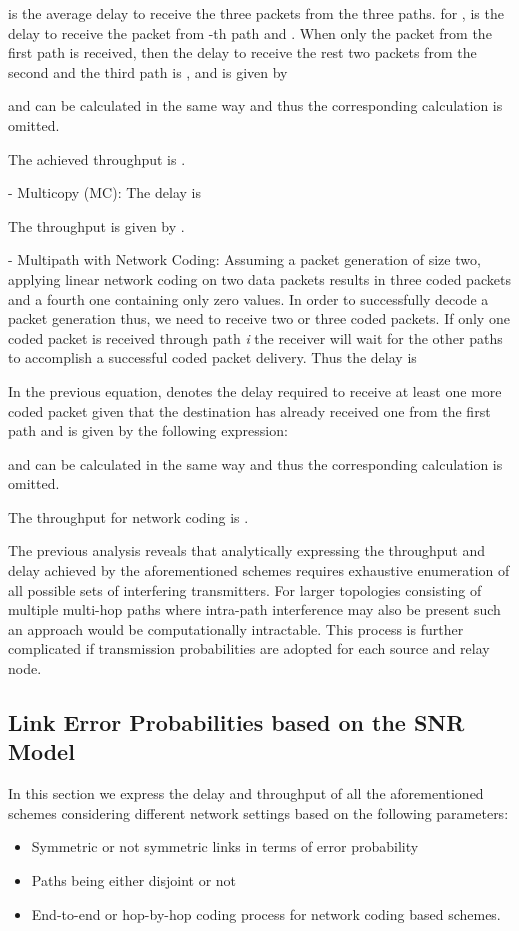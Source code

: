 \documentclass[journal, onecolumn, 12pt]{IEEEtran}
\begin{document}
 is the average delay to receive the three packets from the three paths.  for , is the delay to receive the packet from -th path and .
When only the packet from the first path is received, then the delay to receive the rest two packets from the second and the third path is , and is given by

 and  can be calculated in the same way and thus the corresponding calculation is omitted.

The achieved throughput is .

- Multicopy (MC): The delay is

The throughput is given by .

- Multipath with Network Coding:
Assuming a packet generation of size two, applying linear network coding on two data packets results in three coded packets and a fourth one containing only zero values.
In order to successfully decode a packet generation thus, we need to receive two or three coded packets.
If only one coded packet is received through path \textit{i} the receiver will wait for the other paths to accomplish
a successful coded packet delivery. Thus the delay is



In the previous equation,  denotes the delay required to receive at least one more coded packet given that the destination has already received one from the first path and is given by the following expression:



 and  can be calculated in the same way and thus the corresponding calculation is omitted.

The throughput for network coding is .

The previous analysis reveals that analytically expressing the throughput and delay achieved by the aforementioned schemes requires exhaustive enumeration of all possible sets of interfering transmitters.
For larger topologies consisting of multiple multi-hop paths where intra-path interference may also be present such an approach would be computationally intractable.
This process is further complicated if transmission probabilities are adopted for each source and relay node.

\subsection{Link Error Probabilities based on the SNR Model}
\label{sec:analysis_snr_model}
In this section we express the delay and throughput of all the aforementioned schemes
considering different network settings based on the following parameters:
\begin{itemize}
\item Symmetric or not symmetric links in terms of error probability
\item Paths being either disjoint or not
\item End-to-end or hop-by-hop coding process for network coding based schemes.
\end{itemize}
\end{document}
